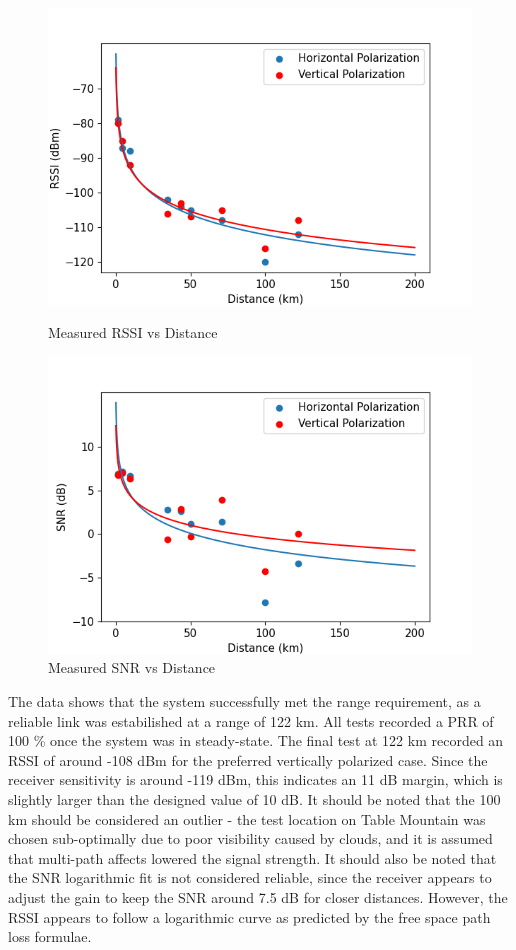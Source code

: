 \begin{figure}[!htb]
  \begin{minipage}{0.5\textwidth}
    \centering
    \includegraphics[width=0.99\linewidth]{rangeRssi}
    \caption{Measured RSSI vs Distance}
    \label{fig:rangeRssi}
  \end{minipage}
  \begin{minipage}{0.5\textwidth}
    \centering
    \includegraphics[width=0.99\linewidth]{rangeSnr}
    \caption{Measured SNR vs Distance}
    \label{fig:rangeSnr}
  \end{minipage}
\end{figure}

The data shows that the system successfully met the range requirement, as a reliable link was estabilished at a range of 122 km. All tests recorded a PRR of 100 \% once the system was in steady-state. The final test at 122 km recorded an RSSI of around -108 dBm for the preferred vertically polarized case. Since the receiver sensitivity is around -119 dBm, this indicates an 11 dB margin, which is slightly larger than the designed value of 10 dB. It should be noted that the 100 km should be considered an outlier - the test location on Table Mountain was chosen sub-optimally due to poor visibility caused by clouds, and it is assumed that multi-path affects lowered the signal strength. It should also be noted that the SNR logarithmic fit is not considered reliable, since the receiver appears to adjust the gain to keep the SNR around 7.5 dB for closer distances. However, the RSSI appears to follow a logarithmic curve as predicted by the free space path loss formulae.